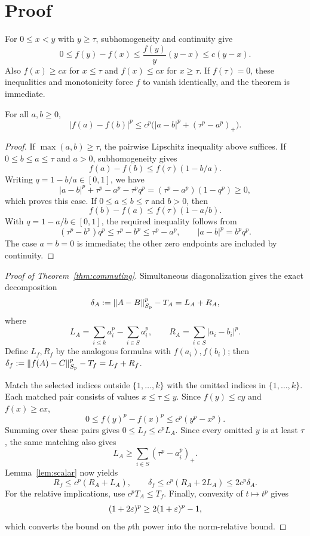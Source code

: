 \documentclass[11pt]{article}
\begin{document}
\section{Proof}
For $0\le x<y$ with $y\ge\tau$, subhomogeneity and continuity give
\[
 0\le f(y)-f(x)\le\frac{f(y)}{y}(y-x)\le c(y-x).
\]
Also $f(x)\ge cx$ for $x\le\tau$ and $f(x)\le cx$ for $x\ge\tau$. If $f(\tau)=0$, these inequalities and monotonicity force $f$ to vanish identically, and the theorem is immediate.

\begin{lemma}\label{lem:scalar}
For all $a,b\ge0$,
\[
 |f(a)-f(b)|^p\le c^p\bigl(|a-b|^p+(\tau^p-a^p)_+\bigr).
\]
\end{lemma}
\begin{proof}
If $\max(a,b)\ge\tau$, the pairwise Lipschitz inequality above suffices.
If $0\le b\le a\le\tau$ and $a>0$, subhomogeneity gives
\[
 f(a)-f(b)\le f(\tau)(1-b/a).
\]
Writing $q=1-b/a\in[0,1]$, we have
\[
 |a-b|^p+\tau^p-a^p-\tau^pq^p
 =(\tau^p-a^p)(1-q^p)\ge0,
\]
which proves this case.
If $0\le a\le b\le\tau$ and $b>0$, then
\[
 f(b)-f(a)\le f(\tau)(1-a/b).
\]
With $q=1-a/b\in[0,1]$, the required inequality follows from
\[
 (\tau^p-b^p)q^p\le\tau^p-b^p\le\tau^p-a^p,
 \qquad |a-b|^p=b^pq^p.
\]
The case $a=b=0$ is immediate; the other zero endpoints are included by continuity.
\end{proof}

\begin{proof}[Proof of Theorem~\ref{thm:commuting}]
Simultaneous diagonalization gives the exact decomposition
\[
 \delta_A:=\left\lVert A-B\right\rVert_{S_p}^p-T_A=L_A+R_A,
\]
where
\[
 L_A=\sum_{i\le k}a_i^p-\sum_{i\in S}a_i^p,\qquad
 R_A=\sum_{i\in S}|a_i-b_i|^p.
\]
Define $L_f,R_f$ by the analogous formulas with $f(a_i),f(b_i)$; then
$\delta_f:=\left\lVert f(A)-C\right\rVert_{S_p}^p-T_f=L_f+R_f$.

Match the selected indices outside $\{1,\ldots,k\}$ with the omitted indices in $\{1,\ldots,k\}$. Each matched pair consists of values $x\le\tau\le y$. Since $f(y)\le cy$ and $f(x)\ge cx$,
\[
 0\le f(y)^p-f(x)^p\le c^p(y^p-x^p).
\]
Summing over these pairs gives $0\le L_f\le c^pL_A$. Since every omitted $y$ is at least $\tau$, the same matching also gives
\[
 L_A\ge\sum_{i\in S}(\tau^p-a_i^p)_+.
\]
Lemma~\ref{lem:scalar} now yields
\[
 R_f\le c^p(R_A+L_A),
 \qquad
 \delta_f\le c^p(R_A+2L_A)\le2c^p\delta_A.
\]
For the relative implications, use $c^pT_A\le T_f$. Finally, convexity of $t\mapsto t^p$ gives
\[
 (1+2\varepsilon)^p\ge2(1+\varepsilon)^p-1,
\]
which converts the bound on the $p$th power into the norm-relative bound.
\end{proof}
\end{document}
